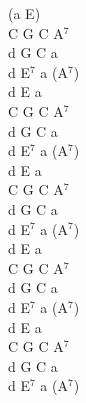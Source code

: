 \documentclass[a5paper, 10pt]{book}
\begin{document}
\begin{minipage}[t]{0.2\textwidth}
(a E)\\
C G C A$^7$\\
d G C a\\
d E$^7$ a (A$^7$)\\

d E a\\
C G C A$^7$\\
d G C a\\
d E$^7$ a (A$^7$)\\

d E a\\
C G C A$^7$\\
d G C a\\
d E$^7$ a (A$^7$)\\

d E a\\
C G C A$^7$\\
d G C a\\
d E$^7$ a (A$^7$)\\

d E a\\
C G C A$^7$\\
d G C a\\
d E$^7$ a (A$^7$)\\
\end{minipage}

\newpage
\end{document}
